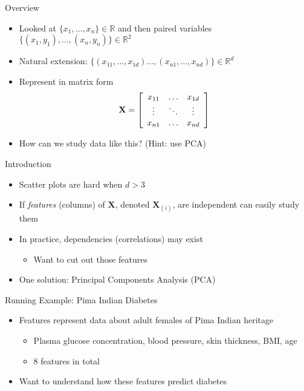 \documentclass{beamer}
\begin{document}
\begin{frame}{Overview} 
\begin{itemize} 
 \item Looked at $\{x_1, \ldots, x_n\} \in \mathbb{R}$ and then paired variables $\{(x_1, y_1), \ldots, (x_n, y_n)\} \in \mathbb{R}^2$
\item Natural extension: $\{(x_{11}, \ldots, x_{1d}) \ldots, (x_{n1}, \ldots, x_{nd})\} \in \mathbb{R}^d$
\item Represent in matrix form 
\begin{displaymath} 
 \textbf{X} = \left[\begin{array}{c c c} x_{11} & \ldots & x_{1d} \\ 
                     \vdots & \ddots & \vdots \\
 x_{n1} & \ldots & x_{nd}  \end{array} \right] 
\end{displaymath}
\item How can we study data like this? (Hint: use PCA)
 \end{itemize}
\end{frame}

\begin{frame}{Introduction}
\begin{itemize} 
 \item Scatter plots are hard when $d > 3$ 
 \item If \emph{features} (columns) of $\textbf{X}$, denoted $\textbf{X}_{(i)}$, are independent can easily study them 
 \item In practice, dependencies (correlations) may exist
  \begin{itemize}
    \item Want to cut out those features
    \end{itemize}
    \item One solution: Principal Components Analysis (PCA)
\end{itemize}
\end{frame}

\begin{frame}{Running Example: Pima Indian Diabetes} 
\begin{itemize}
 \item Features represent data about adult females of Pima Indian heritage
 \begin{itemize}
  \item Plasma glucose concentration, blood pressure, skin thickness, BMI, age 
  \item 8 features in total 
 \end{itemize}
 \item Want to understand how these features predict diabetes 
\end{itemize}
\end{frame}
\end{document}
